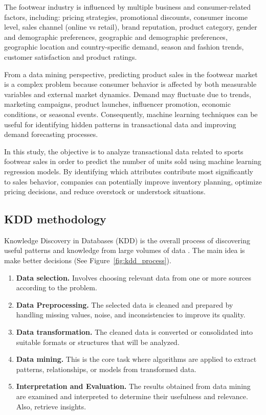\documentclass[12pt]{article}
\begin{document}
The footwear industry is influenced by multiple business and consumer-related factors, including: pricing strategies, promotional discounts, consumer income level, sales channel (online vs retail), brand reputation, product category, gender and demographic preferences, geographic and demographic preferences, geographic location and country-specific demand, season and fashion trends, customer satisfaction and product ratings.

From a data mining perspective, predicting product sales in the footwear market is a complex problem because consumer behavior is affected by both measurable variables and external market dynamics. Demand may fluctuate due to trends, marketing campaigns, product launches, influencer promotion, economic conditions, or seasonal events. Consequently, machine learning techniques can be useful for identifying hidden patterns in transactional data and improving demand forecasting processes.

In this study, the objective is to analyze transactional data related to sports footwear sales in order to predict the number of units sold using machine learning regression models. By identifying which attributes contribute most significantly to sales behavior, companies can potentially improve inventory planning, optimize pricing decisions, and reduce overstock or understock situations.



\subsection{KDD methodology}
Knowledge Discovery in Databases (KDD) is the overall process of discovering useful patterns and knowledge from large volumes of data \cite{kdd_process}. The main idea is make better decisions (See Figure~\ref{fig:kdd_process}).
\begin{enumerate}
  \item \textbf{Data selection.} Involves choosing relevant data from one or more sources according to the problem.
  \item \textbf{Data Preprocessing.} The selected data is cleaned and prepared by handling missing values, noise, and inconsistencies to improve its quality. 
  \item \textbf{Data transformation.} The cleaned data is converted or consolidated into suitable formats or structures that will be analyzed.
  \item \textbf{Data mining.} This is the core task where algorithms are applied to extract patterns, relationships, or models from transformed data.
  \item \textbf{Interpretation and Evaluation.} The results obtained from data mining are examined and interpreted to determine their usefulness and relevance. Also, retrieve insights.
\end{enumerate}
\end{document}
